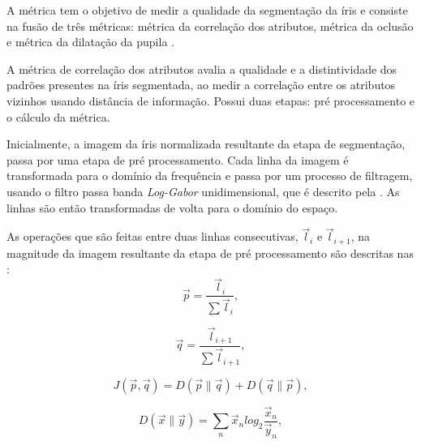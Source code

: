 \par A métrica tem o objetivo de medir a qualidade da segmentação da íris e consiste na fusão de três métricas: métrica da correlação dos atributos, métrica da oclusão e métrica da dilatação da pupila \cite{du2010}.

\par A métrica de correlação dos atributos avalia a qualidade e a distintividade dos padrões presentes na íris segmentada, ao medir a correlação entre os atributos vizinhos usando distância de informação. Possui duas etapas: pré processamento e o cálculo da métrica.

\par Inicialmente, a imagem da íris normalizada resultante da etapa de segmentação, passa por uma etapa de pré processamento. Cada linha da imagem é transformada para o domínio da frequência e passa por um processo de filtragem, usando o filtro passa banda \textit{Log-Gabor} unidimensional, que é descrito pela . As linhas são então transformadas de volta para o domínio do espaço.



\par As operações que são feitas entre duas linhas consecutivas, $\vec{l}_{i}$ e $\vec{l}_{i+1}$, na magnitude da imagem resultante da etapa de pré processamento são descritas nas :
\begin{equation} \label{eq:fce:fcm1}
    \vec{p} = \frac{\vec{l}_{i}}{\sum\vec{l}_{i}},
\end{equation}

\begin{equation} \label{eq:fce:fcm2}
    \vec{q} = \frac{\vec{l}_{i+1}}{\sum\vec{l}_{i+1}},
\end{equation}

\begin{equation} \label{eq:fce:fcm3}
    J(\vec{p},\vec{q}) = D(\vec{p}\parallel\vec{q}) + D(\vec{q}\parallel\vec{p}),
\end{equation}

\begin{equation} \label{eq:fce:fcm4}
    D(\vec{x}\parallel\vec{y}) = \sum_{n}\vec{x}_{n}log_{2}\frac{\vec{x}_{n}}{\vec{y}_{n}},
\end{equation}

